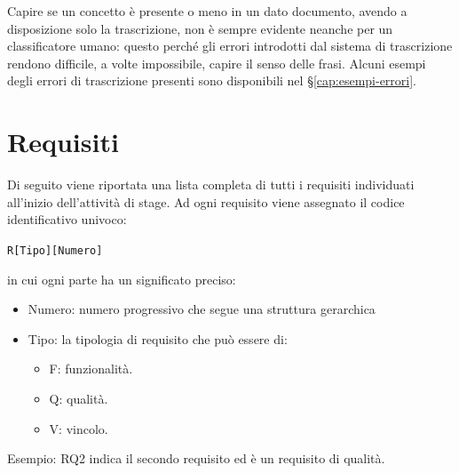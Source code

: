 Capire se un concetto è presente o meno in un dato documento, avendo a disposizione solo la trascrizione, non è sempre evidente neanche per un classificatore umano: questo perché gli errori introdotti dal sistema di trascrizione rendono difficile, a volte impossibile, capire il senso delle frasi. Alcuni esempi degli errori di trascrizione presenti sono disponibili nel §\ref{cap:esempi-errori}.


\section{Requisiti}
Di seguito viene riportata una lista completa di tutti i requisiti individuati all'inizio dell'attività di stage. Ad ogni requisito viene assegnato il codice identificativo univoco:
\begin{center}
    \texttt{R[Tipo][Numero]}    
\end{center}
in cui ogni parte ha un significato preciso:
\begin{itemize}
    \item Numero: numero progressivo che segue una struttura gerarchica
    \item Tipo: la tipologia di requisito che può essere di:
    \begin{itemize}
        \item F: funzionalità.
        \item Q: qualità.
        \item V: vincolo.
    \end{itemize} 
\end{itemize}

Esempio: RQ2 indica il secondo requisito ed è un requisito di qualità.

